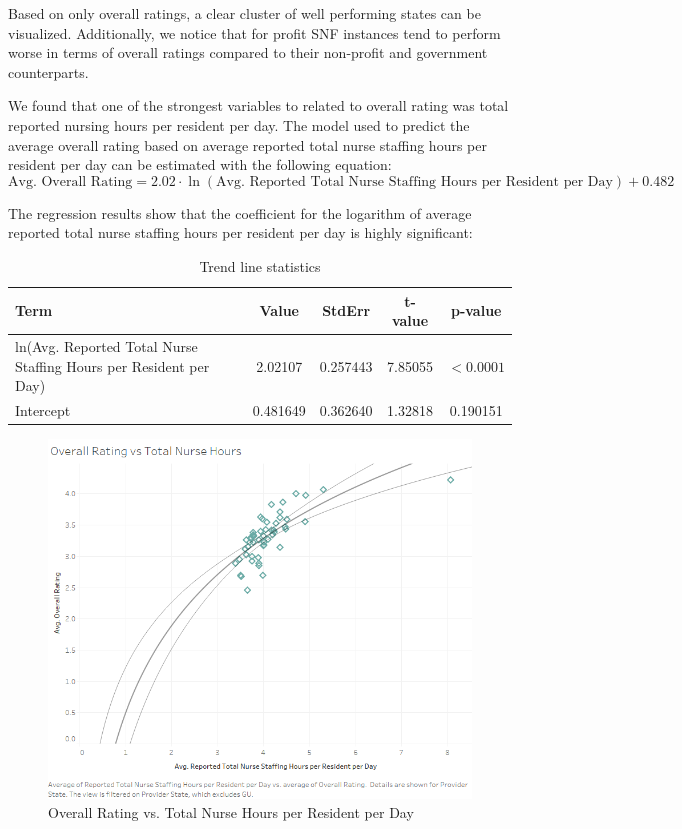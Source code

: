 \documentclass{article}
\theoremstyle{mytheoremstyle}
\theoremstyle{mytheoremstyle}
\theoremstyle{myproblemstyle}
\begin{document}
\noindent Based on only overall ratings, a clear cluster of well performing states can be visualized. Additionally, we notice that for profit SNF instances tend to perform worse in terms of overall ratings compared to their non-profit and government counterparts. 

\pagebreak

We found that one of the strongest variables to related to overall rating was total reported nursing hours per resident per day. The model used to predict the average overall rating based on average reported total nurse staffing hours per resident per day can be estimated with the following equation:
\begin{equation}
    \text{Avg. Overall Rating} = 2.02 \cdot \ln(\text{Avg. Reported Total Nurse Staffing Hours per Resident per Day}) + 0.482
\end{equation}

The regression results show that the coefficient for the logarithm of average reported total nurse staffing hours per resident per day is highly significant:

\begin{table}[ht]
\centering
\caption{Trend line statistics}
\begin{tabular}{@{}lcccc@{}}
\toprule
Term & Value & StdErr & t-value & p-value \\ 
\midrule
ln(Avg. Reported Total Nurse Staffing Hours per Resident per Day) & 2.02107 & 0.257443 & 7.85055 & \(< 0.0001\) \\
Intercept & 0.481649 & 0.362640 & 1.32818 & 0.190151 \\
\bottomrule
\end{tabular}
\end{table}

\begin{figure}[htbp]
\centering
\includegraphics[width=0.7\linewidth]{Images/Overall Rating vs Total Nurse Hours.png}
\caption{Overall Rating vs. Total Nurse Hours per Resident per Day}
\label{Ratings vs nurse hours}
\end{figure}
\end{document}
